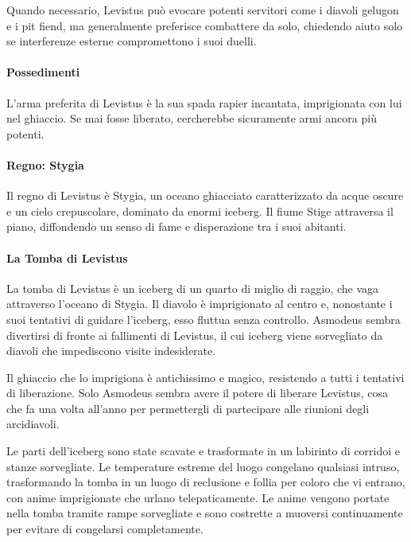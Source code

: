 \documentclass{article}
\begin{document}
            Quando necessario, Levistus può evocare potenti servitori come i diavoli gelugon e i pit fiend, ma generalmente preferisce combattere da solo, chiedendo aiuto solo se interferenze esterne compromettono i suoi duelli.
            
            \paragraph*{Possedimenti}
            L'arma preferita di Levistus è la sua spada rapier incantata, imprigionata con lui nel ghiaccio. Se mai fosse liberato, cercherebbe sicuramente armi ancora più potenti.
            
            \paragraph*{Regno: Stygia}
            Il regno di Levistus è Stygia, un oceano ghiacciato caratterizzato da acque oscure e un cielo crepuscolare, dominato da enormi iceberg. Il fiume Stige attraversa il piano, diffondendo un senso di fame e disperazione tra i suoi abitanti.
            
            \paragraph*{La Tomba di Levistus}
            La tomba di Levistus è un iceberg di un quarto di miglio di raggio, che vaga attraverso l'oceano di Stygia. Il diavolo è imprigionato al centro e, nonostante i suoi tentativi di guidare l'iceberg, esso fluttua senza controllo. Asmodeus sembra divertirsi di fronte ai fallimenti di Levistus, il cui iceberg viene sorvegliato da diavoli che impediscono visite indesiderate.
            
            Il ghiaccio che lo imprigiona è antichissimo e magico, resistendo a tutti i tentativi di liberazione. Solo Asmodeus sembra avere il potere di liberare Levistus, cosa che fa una volta all'anno per permettergli di partecipare alle riunioni degli arcidiavoli.
            
            Le parti dell'iceberg sono state scavate e trasformate in un labirinto di corridoi e stanze sorvegliate. Le temperature estreme del luogo congelano qualsiasi intruso, trasformando la tomba in un luogo di reclusione e follia per coloro che vi entrano, con anime imprigionate che urlano telepaticamente. Le anime vengono portate nella tomba tramite rampe sorvegliate e sono costrette a muoversi continuamente per evitare di congelarsi completamente.
            
\end{document}
